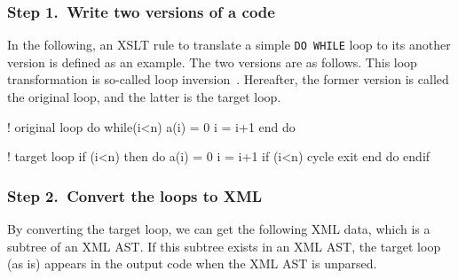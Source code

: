 

\subsubsection*{Step 1.~Write two versions of a code}
In the following, an XSLT rule to translate a simple \texttt{DO WHILE}
loop to its another version is defined as an example.  The two versions
are as follows.  This loop transformation is so-called loop
inversion~\cite{loopinv}.  Hereafter, the former version is called the
original loop, and the latter is the target loop.

\begin{framed}
\begin{src}
! original loop
do while(i<n)
  a(i) = 0
  i = i+1
end do
\end{src}
\end{framed}

\begin{framed}
\begin{src}
! target loop
if (i<n) then
  do
    a(i) = 0
    i = i+1
    if  (i<n)  cycle
    exit
  end do
endif
\end{src}
\end{framed}

\subsubsection*{Step 2.~Convert the loops to XML}

By converting the target loop, we can get the following XML data, which
is a subtree of an XML AST. If this subtree exists in an XML AST, the
target loop (as is) appears in the output code when the XML AST is
unparsed.

